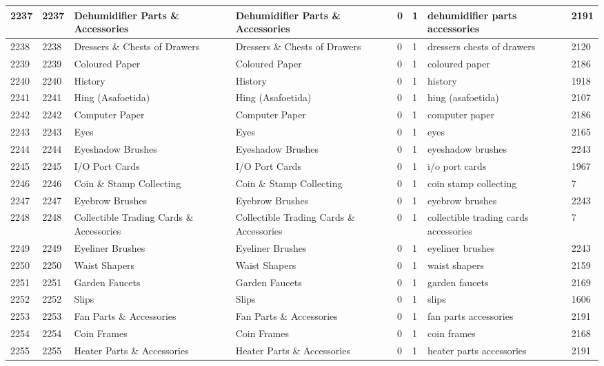 \begin{longtable}{|l|l|l|l|l|l|l|l|}
2237 & 2237 & Dehumidifier Parts \& Accessories & Dehumidifier Parts \& Accessories & 0 & 1 & dehumidifier parts accessories & 2191 \\ \hline 
2238 & 2238 & Dressers \& Chests of Drawers & Dressers \& Chests of Drawers & 0 & 1 & dressers chests of drawers & 2120 \\ \hline 
2239 & 2239 & Coloured Paper & Coloured Paper & 0 & 1 & coloured paper & 2186 \\ \hline 
2240 & 2240 & History & History & 0 & 1 & history & 1918 \\ \hline 
2241 & 2241 & Hing (Asafoetida) & Hing (Asafoetida) & 0 & 1 & hing (asafoetida) & 2107 \\ \hline 
2242 & 2242 & Computer Paper & Computer Paper & 0 & 1 & computer paper & 2186 \\ \hline 
2243 & 2243 & Eyes & Eyes & 0 & 1 & eyes & 2165 \\ \hline 
2244 & 2244 & Eyeshadow Brushes & Eyeshadow Brushes & 0 & 1 & eyeshadow brushes & 2243 \\ \hline 
2245 & 2245 & I/O Port Cards & I/O Port Cards & 0 & 1 & i/o port cards & 1967 \\ \hline 
2246 & 2246 & Coin \& Stamp Collecting & Coin \& Stamp Collecting & 0 & 1 & coin stamp collecting & 7 \\ \hline 
2247 & 2247 & Eyebrow Brushes & Eyebrow Brushes & 0 & 1 & eyebrow brushes & 2243 \\ \hline 
2248 & 2248 & Collectible Trading Cards \& Accessories & Collectible Trading Cards \& Accessories & 0 & 1 & collectible trading cards accessories & 7 \\ \hline 
2249 & 2249 & Eyeliner Brushes & Eyeliner Brushes & 0 & 1 & eyeliner brushes & 2243 \\ \hline 
2250 & 2250 & Waist Shapers & Waist Shapers & 0 & 1 & waist shapers & 2159 \\ \hline 
2251 & 2251 & Garden Faucets & Garden Faucets & 0 & 1 & garden faucets & 2169 \\ \hline 
2252 & 2252 & Slips & Slips & 0 & 1 & slips & 1606 \\ \hline 
2253 & 2253 & Fan Parts \& Accessories & Fan Parts \& Accessories & 0 & 1 & fan parts accessories & 2191 \\ \hline 
2254 & 2254 & Coin Frames & Coin Frames & 0 & 1 & coin frames & 2168 \\ \hline 
2255 & 2255 & Heater Parts \& Accessories & Heater Parts \& Accessories & 0 & 1 & heater parts accessories & 2191 \\ \hline 

\end{longtable}
